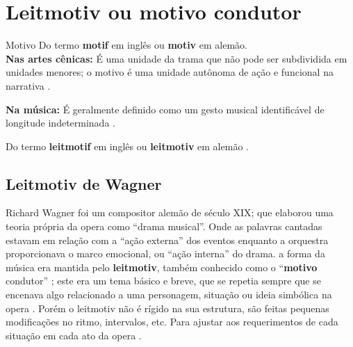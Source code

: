 
\newpage
\section{Leitmotiv ou motivo condutor}
\label{sec:leitmotivdanca}

\begin{tcbinformation}{Motivo}
Do termo \textbf{motif} em inglês ou  \textbf{motiv}  em alemão.\\

\textbf{Nas artes cênicas:}
É uma unidade da trama que não pode ser subdividida em unidades menores;
o motivo é uma unidade autônoma de ação e funcional na narrativa \cite[pp. 221]{pavis1998dictionary}.

\textbf{Na música:}
É geralmente definido como um gesto musical identificável de longitude indeterminada \cite[pp. 123]{powrie2006changing}.

\end{tcbinformation}


\begin{notation}
Do termo \textbf{leitmotif} em inglês ou  \textbf{leitmotiv}  em alemão \cite[pp. 7]{bribitzer2015understanding}.
\end{notation}



\subsection{Leitmotiv de Wagner}
\label{subsec:LeitmotivDeWagner}

Richard Wagner foi um compositor alemão de século XIX; 
que elaborou uma teoria própria da opera como ``drama musical''.
Onde as palavras cantadas estavam em relação com a ``ação externa'' dos eventos
enquanto a orquestra proporcionava o marco emocional, ou ``ação interna'' do drama.
a forma da música era mantida pelo \textbf{leitmotiv}, 
também conhecido como o ``\textbf{motivo} condutor'' \cite[pp. 229-230]{holst1998abc};
este era um tema básico e breve, 
que se repetia sempre que se encenava algo relacionado a uma personagem, 
situação ou ideia simbólica na opera \cite[pp. 229-230]{holst1998abc} \cite[pp. 465-466]{apel1969harvard}.
Porém o leitmotiv não é rígido na sua estrutura, são feitas pequenas modificações no ritmo, intervalos, etc.
Para ajustar aos requerimentos de cada situação em cada ato da opera \cite[pp. 466]{apel1969harvard}.


